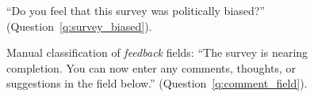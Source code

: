 \begin{figure}[h!]
    \caption[Feeling that the survey was politically biased]{``Do you feel that this survey was politically biased?'' (Question~\ref{q:survey_biased}).
    }\label{fig:survey_biased}
\end{figure}

\begin{figure}[h!]
    \caption[Manual classification of \textit{feedback} fields]{Manual classification of \textit{feedback} fields: ``The survey is nearing completion. You can now enter any comments, thoughts, or suggestions in the field below.'' (Question~\ref{q:comment_field}).
    }\label{fig:comment_field}
\end{figure}



